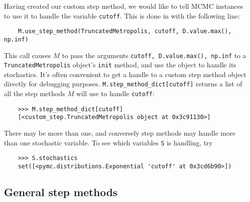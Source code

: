 \medskip
Having created our custom step method, we would like to tell MCMC instances to use it to handle the variable \texttt{cutoff}. This is done in  with the following line:
\begin{verbatim}
	M.use_step_method(TruncatedMetropolis, cutoff, D.value.max(), np.inf)
\end{verbatim}
This call causes $M$ to pass the arguments \texttt{cutoff, D.value.max(), np.inf} to a \texttt{TruncatedMetropolis} object's \texttt{init} method, and use the object to handle its stochastics. It's often convenient to get a handle to a custom step method object directly for debugging purposes. \texttt{M.step_method_dict[cutoff]} returns a list of all the step methods $M$ will use to handle \texttt{cutoff}:
\begin{verbatim}
	>>> M.step_method_dict[cutoff]
	[<custom_step.TruncatedMetropolis object at 0x3c91130>]
\end{verbatim}
There may be more than one, and conversely step methods may handle more than one stochastic variable. To see which variables \texttt{S} is handling, try
\begin{verbatim}
	>>> S.stochastics
	set([<pymc.distributions.Exponential 'cutoff' at 0x3cd6b90>])
\end{verbatim}

\hypertarget{user-gen}{}
\subsection*{General step methods} \label{user-gen}

